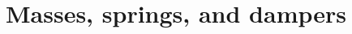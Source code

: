 \documentclass[11pt,a4paper]{book}
\theoremstyle{plain}
\numberwithin{equation}{section}
\newcounter{test}
\newenvironment{test}{
\begin{shaded}\refstepcounter{test}\par\noindent%
\textbf{Test \thetest}
}{
\end{shaded}
}
\newenvironment{randomfloat}{
\begin{figure}
}{
\end{figure}
\addtocounter{figure}{-1}
}
\begin{document}


\section{Masses, springs, and dampers}
\end{document}
